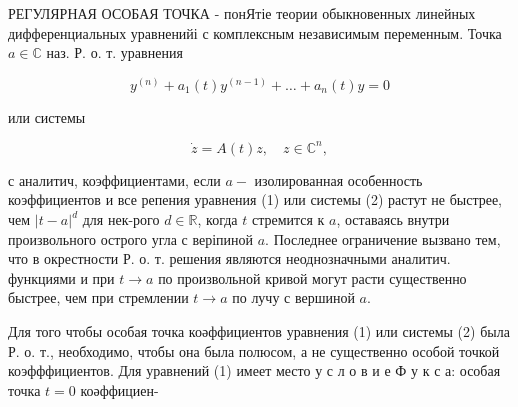 \documentclass[10pt]{article}
\begin{document}
РЕГУЛЯРНАЯ ОСОБАЯ ТОЧКА - понЯтіе теории обыкновенных линейных дифференциальных уравненийі с комплексным независимым переменным. Точка $a \in \mathbb{C}$ наз. Р. о. т. уравнения



\[

y^{(n)}+a_{1}(t) y^{(n-1)}+\ldots+a_{n}(t) y=0

\]



или системы



\[

\dot{z}=A(t) z, \quad z \in \mathbb{C}^{n},

\]



с аналитич, коэффициентами, если $a-$ изолированная особенность коэффициентов и все репения уравнения (1) или системы (2) растут не быстрее, чем $|t-a|^{d}$ для нек-рого $d \in \mathbb{R}$, когда $t$ стремится к $a$, оставаясь внутри произвольного острого угла с веріпиной $a$. Последнее ограничение вызвано тем, что в окрестности Р. о. т. решения являются неоднозначными аналитич. функциями и при $t \rightarrow a$ по произвольной кривой могут расти существенно быстрее, чем при стремлении $t \rightarrow a$ по лучу с вершиной $a$.



Для того чтобы особая точка коәффициентов уравнения (1) или системы (2) была Р. о. т., необходимо, чтобы она была полюсом, а не существенно особой точкой коэфффициентов. Для уравнений (1) имеет место у с л о в и е Ф у к с а: особая точка $t=0$ коәффициен-
\end{document}
